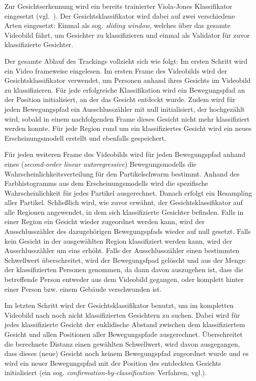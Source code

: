 \documentclass[a4paper, 11pt, twocolumn]{article}
\begin{document}
Zur Gesichtserkennung wird ein bereits trainierter Viola-Jones Klassifikator eingesetzt (vgl.~\cite{aliMultipleHuman}). Der Gesichtsklassifikator wird dabei auf zwei verschiedene Arten eingesetzt: Einmal als sog. \emph{sliding window}, welches über das gesamte Videobild fährt, um Gesichter zu klassifizieren und einmal als Validator für zuvor klassifizierte Gesichter.

Der gesamte Ablauf des Trackings vollzieht sich wie folgt:
Im ersten Schritt wird ein Video frameweise eingelesen. Im ersten Frame des Videobilds wird der Gesichtsklassifikator verwendet, um Personen anhand ihres Gesichts im Videobild zu klassifizieren. Für jede erfolgreiche Klassifikation wird ein Bewegungspfad an der Position initialisiert, an der das Gesicht entdeckt wurde. Zudem wird für jeden Bewegungspfad ein Ausschlusszähler mit null initialisiert, der hochgezählt wird, sobald in einem nachfolgenden Frame dieses Gesicht nicht mehr klassifiziert werden konnte. Für jede Region rund um ein klassifiziertes Gesicht wird ein neues Erscheinungsmodell erstellt und ebenfalls gespeichert.

Für jeden weiteren Frame des Videobilds wird für jeden Bewegungspfad anhand eines (\emph{second-order linear autoregressive}) Bewegungsmodells die Wahrscheinlichkeitsverteilung für den Partikelschwarm bestimmt. Anhand des Farbhistogramms aus dem Erscheinungsmodells wird die spezifische Wahrscheinlichkeit für jedes Partikel ausgerechnet. Danach erfolgt ein Resampling aller Partikel. Schließlich wird, wie zuvor erwähnt, der Gesichtsklassifikator auf alle Regionen angewendet, in dem sich klassifizierte Gesichter befinden. Falls in einer Region ein Gesicht wieder zugeordnet werden kann, wird der Ausschlusszähler des dazugehörigen Bewegungspfads wieder auf null gesetzt. Falls kein Gesicht in der ausgewählten Region klassifiziert werden kann, wird der Ausschlusszähler um eins erhöht. Falls der Ausschlusszähler einen bestimmten Schwellwert überschreitet, wird der Bewegungsfpad gelöscht und aus der Menge der klassifizierten Personen genommen, da dann davon auszugehen ist, dass die betreffende Person entweder aus dem Videobild gegangen, oder komplett hinter einer Person bzw. einem Gebäude verschwunden ist.

Im letzten Schritt wird der Gesichtsklassifikator benutzt, um im kompletten Videobild nach noch nicht klassifizierten Gesichtern zu suchen. Dabei wird für jedes klassifizierte Gesicht der euklidische Abstand zwischen dem klassifiziertem Gesicht und allen Positionen aller Bewegungspfade ausgerechnet. Überschreitet die berechnete Distanz einen gewählten Schwellwert, wird davon ausgegangen, dass dieses (neue) Gesicht noch keinem Bewegungspfad zugeordnet wurde und es wird ein neuer Bewegungspfad mit der Position des entdeckten Gesichts initialisiert (ein sog. \emph{confirmation-by-classification}~Verfahren, vgl.\cite{aliMultipleHuman}).
\end{document}
